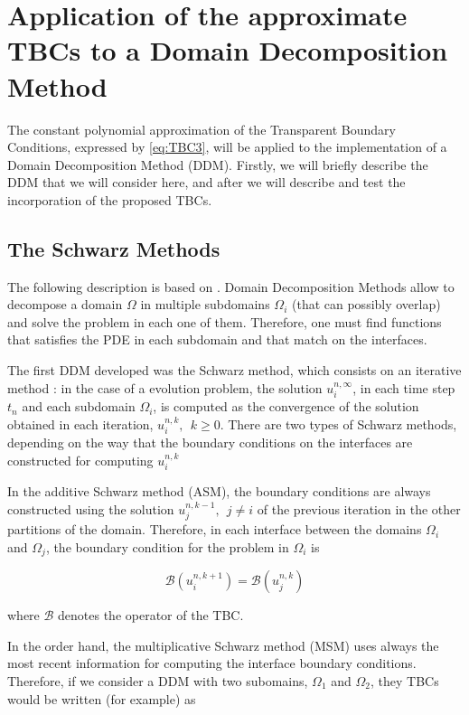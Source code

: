 \section{Application of the approximate TBCs to a Domain Decomposition Method}

\indent The constant polynomial approximation of the Transparent Boundary Conditions, expressed by \ref{eq:TBC3}, will be applied to the implementation of a Domain Decomposition Method (DDM). Firstly, we will briefly describe the DDM that we will consider here, and after we will describe and test the incorporation of the proposed TBCs.

\subsection{The Schwarz Methods}

\indent The following description is based on \cite{Japhet2003}. Domain Decomposition Methods allow to decompose a domain $\Omega$ in multiple subdomains $\Omega_i$ (that can possibly overlap) and solve the problem in each one of them. Therefore, one must find functions that satisfies the PDE in each subdomain and that match on the interfaces. 

\indent The first DDM developed was the Schwarz method, which consists on an iterative method : in the case of a evolution problem, the solution  $u_i^{n,\infty}$, in each time step $t_n$ and each subdomain $\Omega_i$, is computed as the convergence of the solution obtained in each iteration, $u_i^{n,k}, \ \ k\geq 0$. There are two types of Schwarz methods, depending on the way that the boundary conditions on the interfaces are constructed for computing $u_i^{n,k}$

\indent In the additive Schwarz method (ASM), the boundary conditions are always constructed using the solution $u_j^{n,k-1}, \ \ j \neq i$ of the previous iteration in the other partitions of the domain. Therefore, in each interface between the domains $\Omega_i$ and $\Omega_j$, the boundary condition for the problem in $\Omega_i$ is

$$\mathcal{B}(u_i^{n,k+1}) = \mathcal{B}(u_j^{n,k})$$

where $\mathcal{B}$ denotes the operator of the TBC.

\indent In the order hand, the multiplicative Schwarz method (MSM) uses always the most recent information for computing the interface boundary conditions. Therefore, if we consider a DDM with two subomains, $\Omega_1$ and $\Omega_2$,  they TBCs would be written (for example) as 

